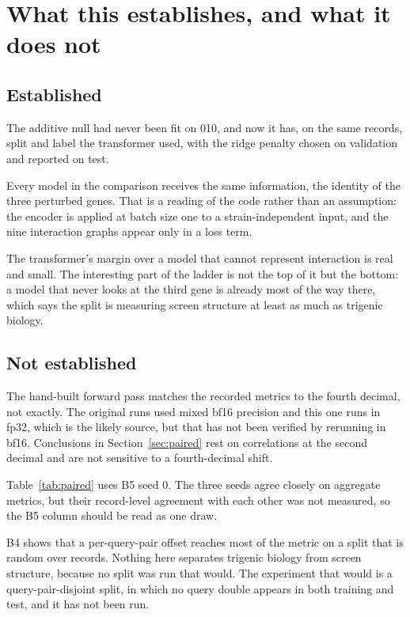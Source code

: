 
\section{What this establishes, and what it does not}
\label{sec:limits}

\subsection{Established}

The additive null had never been fit on 010, and now it has, on the same
records, split and label the transformer used, with the ridge penalty chosen on
validation and reported on test.

Every model in the comparison receives the same information, the identity of the
three perturbed genes. That is a reading of the code rather than an assumption:
the encoder is applied at batch size one to a strain-independent input, and the
nine interaction graphs appear only in a loss term.

The transformer's margin over a model that cannot represent interaction is real
and small. The interesting part of the ladder is not the top of it but the
bottom: a model that never looks at the third gene is already most of the way
there, which says the split is measuring screen structure at least as much as
trigenic biology.

\subsection{Not established}

The hand-built forward pass matches the recorded metrics to the fourth decimal,
not exactly. The original runs used mixed bf16 precision and this one runs in
fp32, which is the likely source, but that has not been verified by rerunning in
bf16. Conclusions in Section~\ref{sec:paired} rest on correlations at the second
decimal and are not sensitive to a fourth-decimal shift.

Table~\ref{tab:paired} uses B5 seed 0. The three seeds agree closely on
aggregate metrics, but their record-level agreement with each other was not
measured, so the B5 column should be read as one draw.

B4 shows that a per-query-pair offset reaches most of the metric on a split that
is random over records. Nothing here separates trigenic biology from screen
structure, because no split was run that would. The experiment that would is a
query-pair-disjoint split, in which no query double appears in both training and
test, and it has not been run.

